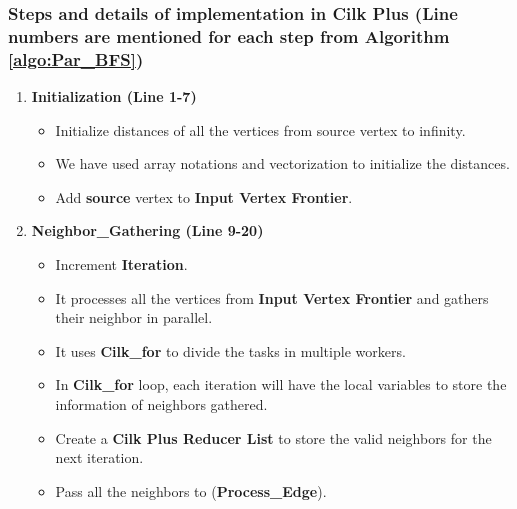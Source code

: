 \documentclass{article}
\begin{document}
\subsubsection{Steps and details of implementation in Cilk Plus (Line numbers are mentioned for each step from Algorithm \ref{algo:Par_BFS}) } 


\begin{enumerate}

\item \textbf{Initialization (Line 1-7)}
\begin{itemize}
\item Initialize distances of all the vertices from source vertex to infinity.\\
\item We have used array notations and vectorization to initialize the distances. \\
\item Add \textbf{source} vertex to \textbf{Input Vertex Frontier}. \\
\end{itemize}


\item \textbf{Neighbor\_Gathering (Line 9-20)}
\begin{itemize}
\item Increment \textbf{Iteration}. \\
\item It processes all the vertices from \textbf{Input Vertex Frontier} and gathers their neighbor in parallel.\\
\item It uses \textbf{Cilk\_for} to divide the tasks in multiple workers. \\
\item In \textbf{Cilk\_for} loop, each iteration will have the local variables to store the information of neighbors gathered. \\
\item Create a \textbf{ Cilk Plus Reducer List} to store the valid neighbors for the next iteration.\\
\item Pass all the neighbors to (\textbf{Process\_Edge}).\\
\end{itemize}


\end{enumerate}
\end{document}
